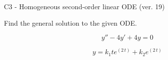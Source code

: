 \begin{exercise}
  \begin{exerciseTitle}C3 - Homogeneous second-order linear ODE (ver. 19)\end{exerciseTitle}
  \begin{exerciseStatement}
    
Find the general solution to the given ODE.

    
\[y''-4y'+4y = 0\]

  \end{exerciseStatement}
  \begin{exerciseAnswer}
    
\[y= k_{1} t e^{\left(2 \, t\right)} + k_{2} e^{\left(2 \, t\right)}\]

  \end{exerciseAnswer}
\end{exercise}